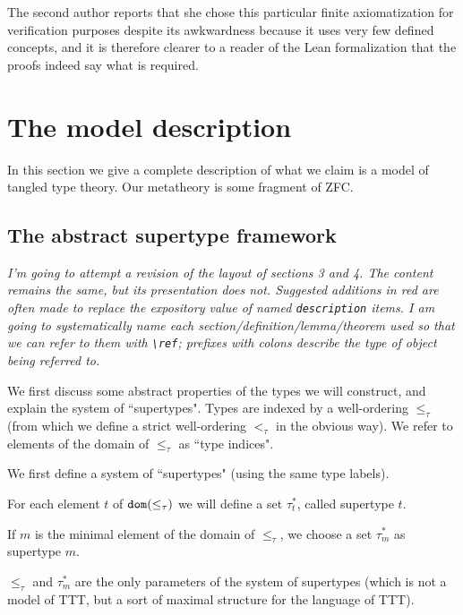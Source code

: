 \documentclass[112pt]{article}
\theoremstyle{definition}
\theoremstyle{remark}
\newcommand{\suggest}[1]{{\color{red} #1}}
\newenvironment{annot}{\begin{center}\color{blue}\sl}{\end{center}}
\begin{document}
The second author reports that she chose this particular finite axiomatization for verification purposes despite its awkwardness because it uses very few defined concepts, and it is therefore clearer to a reader of the Lean formalization that the proofs indeed say what is required.



\newpage

\section{The model description}\label{s:model_description}


In this section we give a complete description of what we claim is a model of tangled type theory.  Our metatheory is some fragment of ZFC.

\subsection{The abstract supertype framework}
\label{ss:supertype_framework}

\begin{annot}
  I'm going to attempt a revision of the layout of sections 3 and 4.
  The content remains the same, but its presentation does not.
  Suggested additions in \suggest{red} are often made to replace the expository value of named {\tt description} items.
  I am going to systematically name each section/definition/lemma/theorem used so that we can refer to them with {\tt \textbackslash ref}; prefixes with colons describe the type of object being referred to.
\end{annot}

{We first discuss some abstract properties of the types we will construct, and explain the system of ``supertypes".}
Types are indexed by a well-ordering $\leq_\tau$ (from which we define a strict well-ordering $<_\tau$ in the obvious way).
We refer to elements of the domain of $\leq_\tau$ as ``type indices".

We first define a system of ``supertypes" (using the same type labels).

For each element $t$ of ${\tt dom}(\leq_\tau)$ we will define a set $\tau^*_t$, called supertype $t$.

If $m$ is the minimal element of the domain of $\leq_\tau$, we choose a set $\tau^*_m$ as supertype $m$.

$\leq_\tau$ and $\tau^*_m$ are the only parameters of the system of supertypes (which is not a model of TTT, but a sort of maximal structure for the language of TTT).
\end{document}
